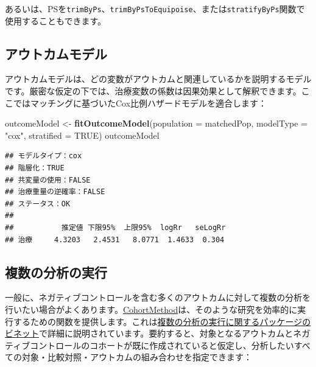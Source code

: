 \documentclass[
  11pt]{book}
\newenvironment{Shaded}{\begin{snugshade}}{\end{snugshade}}
\newcommand{\AttributeTok}[1]{\textcolor[rgb]{0.13,0.29,0.53}{#1}}
\newcommand{\ConstantTok}[1]{\textcolor[rgb]{0.56,0.35,0.01}{#1}}
\newcommand{\FunctionTok}[1]{\textcolor[rgb]{0.13,0.29,0.53}{\textbf{#1}}}
\newcommand{\NormalTok}[1]{#1}
\newcommand{\OtherTok}[1]{\textcolor[rgb]{0.56,0.35,0.01}{#1}}
\newcommand{\StringTok}[1]{\textcolor[rgb]{0.31,0.60,0.02}{#1}}
\theoremstyle{definition}
\theoremstyle{definition}
\theoremstyle{definition}
\theoremstyle{definition}
\theoremstyle{remark}
\begin{document}
あるいは、PSを\texttt{trimByPs}、\texttt{trimByPsToEquipoise}、または\texttt{stratifyByPs}関数で使用することもできます。

\subsection{アウトカムモデル}\label{ux30a2ux30a6ux30c8ux30abux30e0ux30e2ux30c7ux30eb}

アウトカムモデルは、どの変数がアウトカムと関連しているかを説明するモデルです。厳密な仮定の下では、治療変数の係数は因果効果として解釈できます。ここではマッチングに基づいたCox比例ハザードモデルを適合します：

\begin{Shaded}
\begin{Highlighting}[]
\NormalTok{outcomeModel }\OtherTok{\textless{}{-}} \FunctionTok{fitOutcomeModel}\NormalTok{(}\AttributeTok{population =}\NormalTok{ matchedPop,}
                                \AttributeTok{modelType =} \StringTok{"cox"}\NormalTok{,}
                                \AttributeTok{stratified =} \ConstantTok{TRUE}\NormalTok{)}
\NormalTok{outcomeModel}
\end{Highlighting}
\end{Shaded}

\begin{verbatim}
## モデルタイプ：cox
## 階層化：TRUE
## 共変量の使用：FALSE
## 治療重量の逆確率：FALSE
## ステータス：OK
## 
##           推定値 下限95%  上限95%  logRr   seLogRr
## 治療     4.3203   2.4531   8.0771  1.4633  0.304
\end{verbatim}

\subsection{複数の分析の実行}\label{MultipleAnalyses}

一般に、ネガティブコントロールを含む多くのアウトカムに対して複数の分析を行いたい場合がよくあります。\href{https://ohdsi.github.io/CohortMethod/}{CohortMethod}は、そのような研究を効率的に実行するための関数を提供します。これは\href{https://ohdsi.github.io/CohortMethod/articles/MultipleAnalyses.html}{複数の分析の実行に関するパッケージのビネット}で詳細に説明されています。要約すると、対象となるアウトカムとネガティブコントロールのコホートが既に作成されていると仮定し、分析したいすべての対象・比較対照・アウトカムの組み合わせを指定できます：
\end{document}
